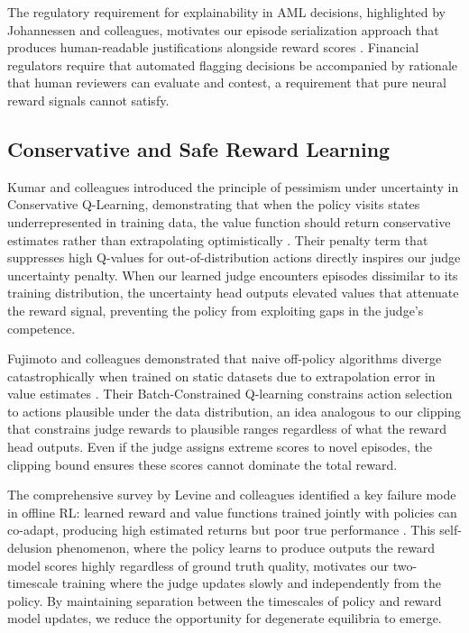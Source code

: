 \documentclass[11pt,a4paper]{article}
\begin{document}
The regulatory requirement for explainability in AML decisions, highlighted by Johannessen and colleagues, motivates our episode serialization approach that produces human-readable justifications alongside reward scores \citep{johannessen2023explainable}. Financial regulators require that automated flagging decisions be accompanied by rationale that human reviewers can evaluate and contest, a requirement that pure neural reward signals cannot satisfy.

\subsection{Conservative and Safe Reward Learning}

Kumar and colleagues introduced the principle of pessimism under uncertainty in Conservative Q-Learning, demonstrating that when the policy visits states underrepresented in training data, the value function should return conservative estimates rather than extrapolating optimistically \citep{kumar2020conservative}. Their penalty term that suppresses high Q-values for out-of-distribution actions directly inspires our judge uncertainty penalty. When our learned judge encounters episodes dissimilar to its training distribution, the uncertainty head outputs elevated values that attenuate the reward signal, preventing the policy from exploiting gaps in the judge's competence.

Fujimoto and colleagues demonstrated that naive off-policy algorithms diverge catastrophically when trained on static datasets due to extrapolation error in value estimates \citep{fujimoto2019off}. Their Batch-Constrained Q-learning constrains action selection to actions plausible under the data distribution, an idea analogous to our clipping that constrains judge rewards to plausible ranges regardless of what the reward head outputs. Even if the judge assigns extreme scores to novel episodes, the clipping bound ensures these scores cannot dominate the total reward.

The comprehensive survey by Levine and colleagues identified a key failure mode in offline RL: learned reward and value functions trained jointly with policies can co-adapt, producing high estimated returns but poor true performance \citep{levine2020offline}. This self-delusion phenomenon, where the policy learns to produce outputs the reward model scores highly regardless of ground truth quality, motivates our two-timescale training where the judge updates slowly and independently from the policy. By maintaining separation between the timescales of policy and reward model updates, we reduce the opportunity for degenerate equilibria to emerge.
\end{document}
